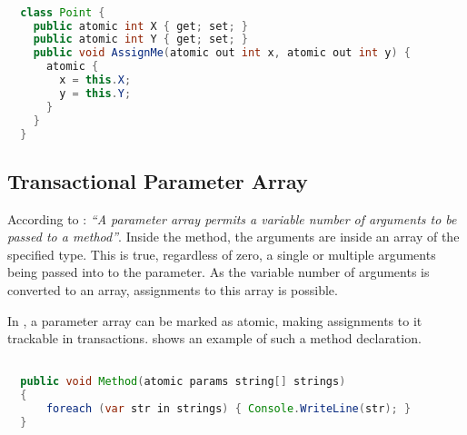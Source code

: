 \begin{lstlisting}[label=lst:atomic_out,
  caption={Transactional Output Parameter},
  language=Java,  
  showspaces=false,
  showtabs=false,
  breaklines=true,
  showstringspaces=false,
  breakatwhitespace=true,
  commentstyle=\color{greencomments},
  keywordstyle=\color{bluekeywords},
  stringstyle=\color{redstrings},
  morekeywords={atomic, retry, orElse, var, get, set}]  % Start your code-block

  class Point {
    public atomic int X { get; set; }
    public atomic int Y { get; set; }
    public void AssignMe(atomic out int x, atomic out int y) {
      atomic { 
        x = this.X;
        y = this.Y;
      }
    }    
  }
\end{lstlisting}

\subsection{Transactional Parameter Array}
According to \cite[p. 17]{csharp2013specificaiton}: \textit{``A parameter array permits a variable number of arguments to be passed to a method''}. Inside the method, the arguments are inside an array of the specified type. This is true, regardless of zero, a single or multiple arguments being passed into to the parameter. As the variable number of arguments is converted to an array, assignments to this array is possible. 

In \stmname, a parameter array can be marked as atomic, making assignments to it trackable in transactions.  shows an example of such a method declaration.
\begin{lstlisting}[label=lst:design_param_array,
  caption={Transactional Parameter Array},
  language=Java,  
  showspaces=false,
  showtabs=false,
  breaklines=true,
  showstringspaces=false,
  breakatwhitespace=true,
  commentstyle=\color{greencomments},
  keywordstyle=\color{bluekeywords},
  stringstyle=\color{redstrings},
  morekeywords={atomic, retry, orElse, var, get, set, params, string, in, foreach}]  % Start your code-block

  public void Method(atomic params string[] strings)
  {
      foreach (var str in strings) { Console.WriteLine(str); }
  }
    
\end{lstlisting}

